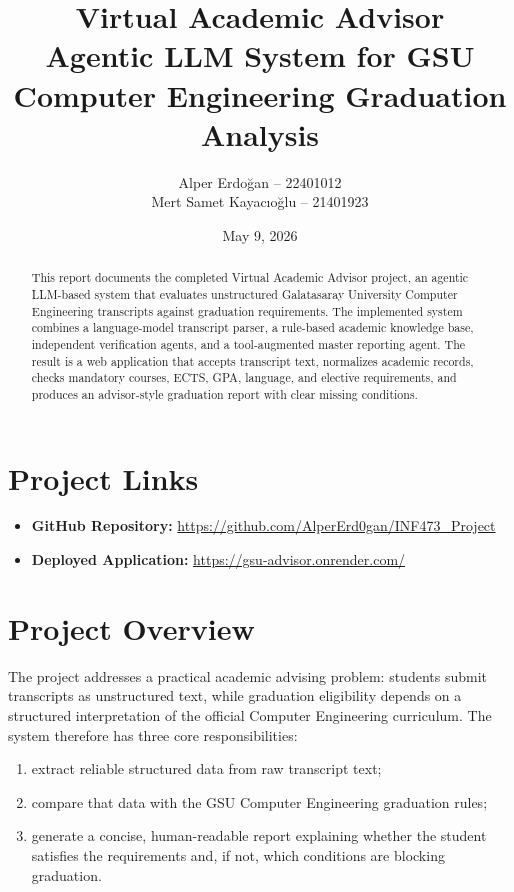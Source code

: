 \documentclass[11pt,a4paper]{article}
\title{\textbf{Virtual Academic Advisor}\\
\large Agentic LLM System for GSU Computer Engineering Graduation Analysis}
\author{Alper Erdoğan -- 22401012\\
Mert Samet Kayacıoğlu -- 21401923}
\date{May 9, 2026}
\begin{document}
\maketitle

\begin{abstract}
This report documents the completed Virtual Academic Advisor project, an agentic
LLM-based system that evaluates unstructured Galatasaray University Computer
Engineering transcripts against graduation requirements. The implemented system
combines a language-model transcript parser, a rule-based academic knowledge
base, independent verification agents, and a tool-augmented master
reporting agent. The result is a web application that accepts transcript text,
normalizes academic records, checks mandatory courses, ECTS, GPA, language, and
elective requirements, and produces an advisor-style graduation report with
clear missing conditions.
\end{abstract}

\section*{Project Links}

\begin{itemize}
  \item \textbf{GitHub Repository:} \url{https://github.com/AlperErd0gan/INF473_Project}
  \item \textbf{Deployed Application:} \url{https://gsu-advisor.onrender.com/}
\end{itemize}

\tableofcontents
\newpage

\section{Project Overview}

The project addresses a practical academic advising problem: students submit
transcripts as unstructured text, while graduation eligibility depends on a
structured interpretation of the official Computer Engineering curriculum. The
system therefore has three core responsibilities:

\begin{enumerate}
  \item extract reliable structured data from raw transcript text;
  \item compare that data with the GSU Computer Engineering graduation rules;
  \item generate a concise, human-readable report explaining whether the student
  satisfies the requirements and, if not, which conditions are blocking
  graduation.
\end{enumerate}
\end{document}
